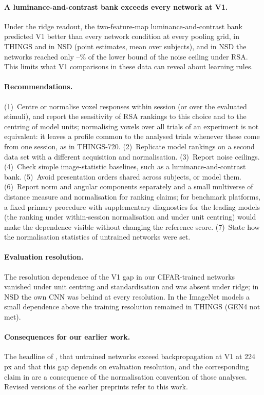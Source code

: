 \paragraph{A luminance-and-contrast bank exceeds every network at V1.}
Under the ridge readout, the two-feature-map luminance-and-contrast bank predicted V1 better than every
network condition at every pooling grid, in THINGS and in NSD (point estimates, mean over subjects), and
in NSD the networks reached only \CeilVoneFracMin--\CeilVoneFracMax\% of the lower bound of the noise
ceiling under RSA. This limits what V1 comparisons in these data can reveal about learning rules.

\paragraph{Recommendations.}
(1)~Centre or normalise voxel responses within session (or over the evaluated stimuli), and report the
sensitivity of RSA rankings to this choice and to the centring of model units; normalising voxels over all
trials of an experiment is not equivalent: it leaves a profile common to the analysed trials whenever
these come from one session, as in THINGS-720. (2)~Replicate model rankings on a second data set with a
different acquisition and normalisation. (3)~Report noise ceilings. (4)~Check simple image-statistic
baselines, such as a luminance-and-contrast bank. (5)~Avoid presentation orders shared across subjects, or
model them. (6)~Report norm and angular components separately and a small multiverse of distance measure
and normalisation for ranking claims; for benchmark platforms, a fixed primary procedure with supplementary
diagnostics for the leading models (the ranking under within-session normalisation and under unit centring)
would make the dependence visible without changing the reference score. (7)~State how the normalisation
statistics of untrained networks were set.

\paragraph{Evaluation resolution.}
The resolution dependence of the V1 gap in our CIFAR-trained networks vanished under unit centring and
standardisation and was absent under ridge; in NSD the own CNN was behind at every resolution. In the ImageNet
models a small dependence above the training resolution remained in THINGS (GEN4 not met).

\paragraph{Consequences for our earlier work.}
The headline of \citet{evalres}, that untrained networks exceed backpropagation at V1 at 224\,px and that
this gap depends on evaluation resolution, and the corresponding claim in \citet{leutenegger2026} are a
consequence of the normalisation convention of those analyses. Revised versions of the earlier preprints
refer to this work.

